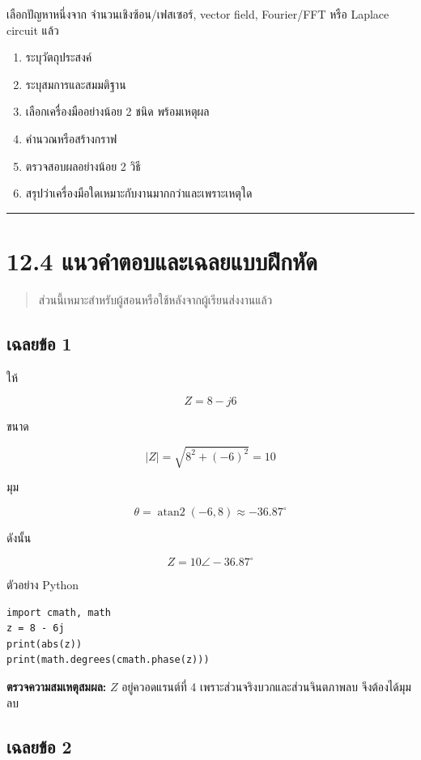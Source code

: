 เลือกปัญหาหนึ่งจาก จำนวนเชิงซ้อน/เฟสเซอร์, vector field, Fourier/FFT หรือ Laplace circuit แล้ว

\begin{enumerate}
    \item ระบุวัตถุประสงค์
    \item ระบุสมการและสมมติฐาน
    \item เลือกเครื่องมืออย่างน้อย 2 ชนิด พร้อมเหตุผล
    \item คำนวณหรือสร้างกราฟ
    \item ตรวจสอบผลอย่างน้อย 2 วิธี
    \item สรุปว่าเครื่องมือใดเหมาะกับงานมากกว่าและเพราะเหตุใด
\end{enumerate}

\par\noindent\rule{\textwidth}{0.4pt}\par

\section{12.4 แนวคำตอบและเฉลยแบบฝึกหัด}

\begin{quote}
ส่วนนี้เหมาะสำหรับผู้สอนหรือใช้หลังจากผู้เรียนส่งงานแล้ว
\end{quote}

\subsection{เฉลยข้อ 1}

ให้

\[
Z=8-j6
\]

ขนาด

\[
|Z|=\sqrt{8^2+(-6)^2}=10
\]

มุม

\[
\theta=\operatorname{atan2}(-6,8)\approx-36.87^\circ
\]

ดังนั้น

\[
Z=10\angle-36.87^\circ
\]

ตัวอย่าง Python

\begin{verbatim}
import cmath, math
z = 8 - 6j
print(abs(z))
print(math.degrees(cmath.phase(z)))
\end{verbatim}

\textbf{ตรวจความสมเหตุสมผล:} $Z$ อยู่ควอดแรนต์ที่ 4 เพราะส่วนจริงบวกและส่วนจินตภาพลบ จึงต้องได้มุมลบ

\subsection{เฉลยข้อ 2}

